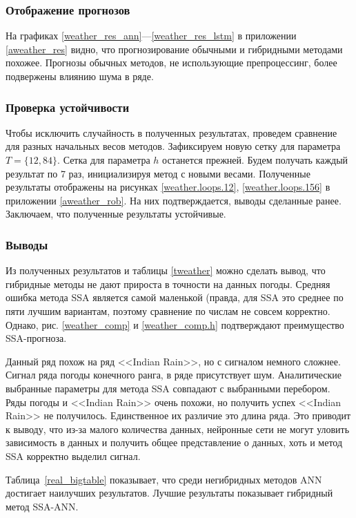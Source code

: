 \documentclass[specialist,
               substylefile = spbu.rtx,
               subf,href,colorlinks=true, 12p]{disser}
\newcommand{\multiref}[2]{\ref{#1}---\ref{#2}}
\begin{document}
\subsubsection{Отображение прогнозов}

На графиках \multiref{weather_res_ann}{weather_res_lstm} в приложении \ref{aweather_res} видно, что прогнозирование обычными и гибридными методами похожее. Прогнозы обычных методов, не использующие препроцессинг, более подвержены влиянию шума в ряде.

\subsubsection{Проверка устойчивости}
Чтобы исключить случайность в полученных результатах, проведем сравнение для разных начальных весов методов. Зафиксируем новую сетку для параметра $T = \{12, 84\}$. Сетка для параметра $h$ останется прежней. Будем получать каждый результат по 7 раз, инициализируя метод с новыми весами. Полученные результаты отображены на рисунках \ref{weather.loops.12}, \ref{weather.loops.156} в приложении \ref{aweather_rob}. На них подтверждается, выводы сделанные ранее. Заключаем, что полученные результаты устойчивые.

\subsubsection{Выводы}
Из полученных результатов и таблицы \ref{tweather} можно сделать вывод, что гибридные методы не дают прироста в точности на данных погоды. Средняя ошибка метода SSA является самой маленькой (правда, для SSA это среднее по пяти лучшим вариантам, поэтому сравнение по числам не совсем корректно. Однако, рис. \ref{weather_comp} и \ref{weather_comp.h} подтверждают преимущество SSA-прогноза.

Данный ряд похож на ряд <<Indian Rain>>, но с сигналом немного сложнее. Сигнал ряда погоды конечного ранга, в ряде присутствует шум. Аналитические выбранные параметры для метода SSA совпадают с выбранными перебором. Ряды погоды и <<Indian Rain>> очень похожи, но получить успех <<Indian Rain>> не получилось. Единственное их различие это длина ряда. Это приводит к выводу, что из-за малого количества данных, нейронные сети не могут уловить зависимость в данных и получить общее представление о данных, хоть и метод SSA корректно выделил сигнал.

Таблица~\ref{real_bigtable} показывает, что среди негибридных методов ANN достигает наилучших результатов. Лучшие результаты показывает гибридный метод SSA-ANN.
\end{document}
